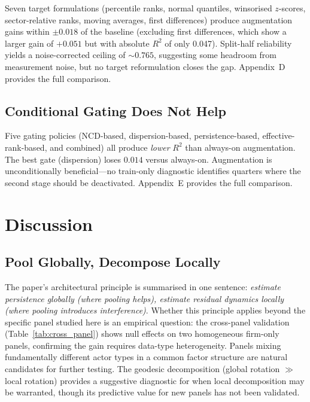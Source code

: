 \documentclass[11pt,a4paper]{article}
\begin{document}
Seven target formulations (percentile ranks, normal quantiles, winsorised $z$-scores, sector-relative ranks, moving averages, first differences) produce augmentation gains within $\pm 0.018$ of the baseline (excluding first differences, which show a larger gain of $+0.051$ but with absolute $R^2$ of only 0.047). Split-half reliability yields a noise-corrected ceiling of ${\sim}0.765$, suggesting some headroom from measurement noise, but no target reformulation closes the gap. Appendix~D provides the full comparison.

\subsection{Conditional Gating Does Not Help}

Five gating policies (NCD-based, dispersion-based, persistence-based, effective-rank-based, and combined) all produce \emph{lower} $R^2$ than always-on augmentation. The best gate (dispersion) loses $0.014$ versus always-on. Augmentation is unconditionally beneficial---no train-only diagnostic identifies quarters where the second stage should be deactivated. Appendix~E provides the full comparison.



\section{Discussion}
\label{sec:discussion}

\subsection{Pool Globally, Decompose Locally}

The paper's architectural principle is summarised in one sentence: \emph{estimate persistence globally (where pooling helps), estimate residual dynamics locally (where pooling introduces interference)}. Whether this principle applies beyond the specific panel studied here is an empirical question: the cross-panel validation (Table~\ref{tab:cross_panel}) shows null effects on two homogeneous firm-only panels, confirming the gain requires data-type heterogeneity. Panels mixing fundamentally different actor types in a common factor structure are natural candidates for further testing. The geodesic decomposition (global rotation $\gg$ local rotation) provides a suggestive diagnostic for when local decomposition may be warranted, though its predictive value for new panels has not been validated.
\end{document}
